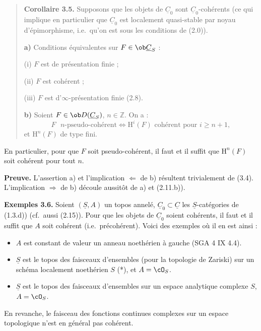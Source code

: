 \begin{quote}
\textbf{Corollaire 3.5.} Supposons que les objets de $\underline{C}_0$ sont $\underline{C}_0$-cohérents (ce qui implique en particulier que $\underline{C}_0$ est localement quasi-stable par noyau d'épimorphisme, i.e.\ qu'on est sous les conditions de (2.0)).

\textbf{a)} Conditions équivalentes sur $F \in \ob \underline{C}_S$ :

\quad\textup{(i)} $F$ est de présentation finie ;

\quad\textup{(ii)} $F$ est cohérent ;

\quad\textup{(iii)} $F$ est d'$\infty$-présentation finie (2.8).

\textbf{b)} Soient $F \in \ob D(\underline{C}_S)$, $n \in \mathbb{Z}$. On a :
\[
F \text{ $n$-pseudo-cohérent} \Leftrightarrow \mathrm{H}^i(F) \text{ cohérent pour } i \geqslant n+1,
\]
et $\mathrm{H}^n(F)$ de type fini.
\end{quote}

En particulier, pour que $F$ soit pseudo-cohérent, il faut et il suffit que $\mathrm{H}^n(F)$ soit cohérent pour tout $n$.

\textbf{Preuve.} L'assertion a) et l'implication $\Leftarrow$ de b) résultent trivialement de (3.4). L'implication $\Rightarrow$ de b) découle aussitôt de a) et (2.11.b)).

\textbf{Exemples 3.6.} Soient $(\underline{S}, A)$ un topos annelé, $\underline{C}_0 \subset \underline{C}$ les $\underline{S}$-catégories de (1.3.d)) (cf.\ aussi (2.15)). Pour que les objets de $\underline{C}_0$ soient cohérents, il faut et il suffit que $A$ soit cohérent (i.e.\ précohérent). Voici des exemples où il en est ainsi :
\begin{itemize}
\item $A$ est constant de valeur un anneau noethérien à gauche (SGA 4 IX 4.4).
\item $\underline{S}$ est le topos des faisceaux d'ensembles (pour la topologie de Zariski) sur un schéma localement noethérien $S$ (*), et $A = \cO_S$.
\item $\underline{S}$ est le topos des faisceaux d'ensembles sur un espace analytique complexe $S$, $A = \cO_S$.
\end{itemize}
En revanche, le faisceau des fonctions continues complexes sur un espace topologique n'est en général pas cohérent.

